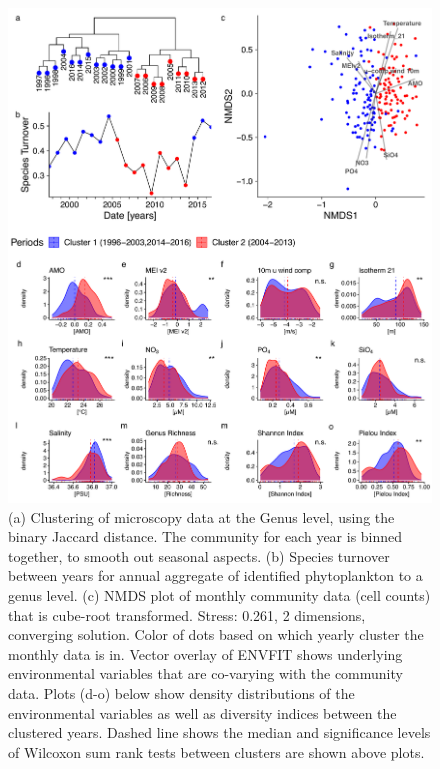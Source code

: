 \documentclass[draft]{agujournal2019}
\begin{document}
\begin{figure}
\noindent\includegraphics[width=\textwidth]{fig/ClusteringCompPlot_NEW 2.pdf}
\caption{(a) Clustering of microscopy data at the Genus level, using the binary Jaccard distance. The community for each year is binned together, to smooth out seasonal aspects. (b) Species turnover between years for annual aggregate of identified phytoplankton to a genus level. (c) NMDS plot of monthly community data (cell counts) that is cube-root transformed. Stress: 0.261, 2 dimensions, converging solution. Color of dots based on which yearly cluster the monthly data is in. Vector overlay of ENVFIT shows underlying environmental variables that are co-varying with the community data.
Plots (d-o) below show density distributions of the environmental variables as well as diversity indices between the clustered years. Dashed line shows the median and significance levels of Wilcoxon sum rank tests between clusters are shown above plots.}
\label{fig:clustering}
\end{figure}
\end{document}

